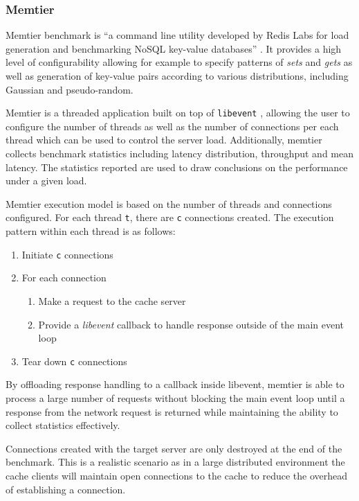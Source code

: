 \subsubsection{Memtier}
Memtier benchmark is ``a command line utility developed by Redis Labs for load generation and benchmarking NoSQL key-value databases'' \cite{memtier}. It provides a high level of configurability allowing for example to specify patterns of \textit{sets} and \textit{gets} as well as generation of key-value pairs according to various distributions, including Gaussian and pseudo-random.

Memtier is a threaded application built on top of \texttt{libevent} \cite{libevent}, allowing the user to configure the number of threads as well as the number of connections per each thread which can be used to control the server load. Additionally, memtier collects benchmark statistics including latency distribution, throughput and mean latency. The statistics reported are used to draw conclusions on the performance under a given load.

Memtier execution model is based on the number of threads and connections configured. For each thread \texttt{t}, there are \texttt{c} connections created. The execution pattern within each thread is as follows:

\begin{enumerate}
    \item Initiate \texttt{c} connections
    \item For each connection
        \begin{enumerate}
            \item Make a request to the cache server
            \item Provide a \textit{libevent} callback to handle response outside of the main event loop
        \end{enumerate}
    \item Tear down \texttt{c} connections
\end{enumerate}

By offloading response handling to a callback inside libevent, memtier is able to process a large number of requests without blocking the main event loop until a response from the network request is returned while maintaining the ability to collect statistics effectively.

Connections created with the target server are only destroyed at the end of the benchmark. This is a realistic scenario as in a large distributed environment the cache clients will maintain open connections to the cache to reduce the overhead of establishing a connection.


